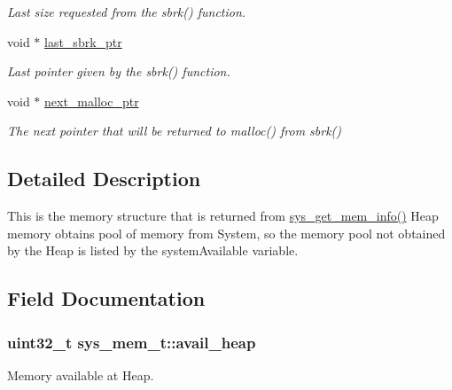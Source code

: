 \begin{DoxyCompactItemize}
\begin{DoxyCompactList}\small\item\em Last size requested from the sbrk() function. \end{DoxyCompactList}\item 
void $\ast$ \hyperlink{structsys__mem__t_ac8a8ed2fb96fae8f0e7961a5c234b3a0}{last\+\_\+sbrk\+\_\+ptr}
\begin{DoxyCompactList}\small\item\em Last pointer given by the sbrk() function. \end{DoxyCompactList}\item 
void $\ast$ \hyperlink{structsys__mem__t_a3178ccefa2e90fa6723f77ff95b94d2a}{next\+\_\+malloc\+\_\+ptr}
\begin{DoxyCompactList}\small\item\em The next pointer that will be returned to malloc() from sbrk() \end{DoxyCompactList}\end{DoxyCompactItemize}


\subsection{Detailed Description}
This is the memory structure that is returned from \hyperlink{lpc__sys_8h_afc535b417b46f909b8d70f1d2559f6f4}{sys\+\_\+get\+\_\+mem\+\_\+info()} Heap memory obtains pool of memory from System, so the memory pool not obtained by the Heap is listed by the system\+Available variable. 

\subsection{Field Documentation}
\subsubsection[{\texorpdfstring{avail\+\_\+heap}{avail_heap}}]{\setlength{\rightskip}{0pt plus 5cm}uint32\+\_\+t sys\+\_\+mem\+\_\+t\+::avail\+\_\+heap}\hypertarget{structsys__mem__t_a617bcd6f4de9e85e62939fe355f952aa}{}\label{structsys__mem__t_a617bcd6f4de9e85e62939fe355f952aa}


Memory available at Heap. 

